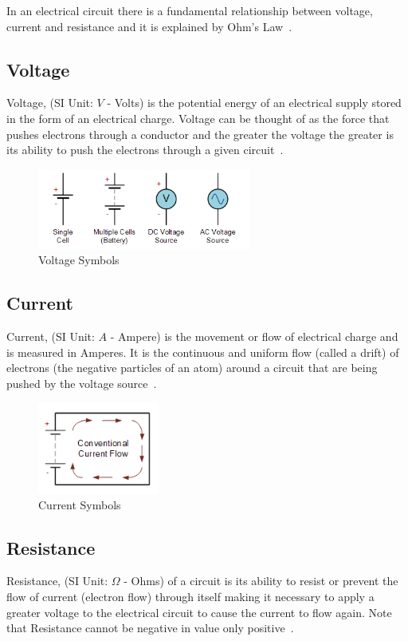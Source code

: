 In an electrical circuit there is a fundamental relationship between voltage, current and resistance and it is explained by Ohm’s Law~\citep{et-15}.

\subsection*{Voltage}
Voltage, (SI Unit: $V$ - Volts) is the potential energy of an electrical supply stored in the form of an electrical charge. Voltage can be thought of as the force that pushes electrons through a conductor and the greater the voltage the greater is its ability to push the electrons through a given circuit~\citep{et-15}.

%
\begin{figure}[ht]
	\centering
	\includegraphics[width=7cm]{images/02}
	\caption{Voltage Symbols \citep{et-15}}
	\label{fig:voltage_symbols}
\end{figure}
%

\subsection*{Current}
Current, (SI Unit: $A$ - Ampere) is the movement or flow of electrical charge and is measured in Amperes. It is the continuous and uniform flow (called a drift) of electrons (the negative particles of an atom) around a circuit that are being pushed by the voltage source~\citep{et-15}.

%
\begin{figure}[ht]
	\centering
	\includegraphics[width=4cm]{images/03}
	\caption{Current Symbols \citep{et-15}}
	\label{fig:current_symbols}
\end{figure}
%

\newpage
\subsection*{Resistance}
Resistance, (SI Unit: $\Omega$ - Ohms) of a circuit is its ability to resist or prevent the flow of current (electron flow) through itself making it necessary to apply a greater voltage to the electrical circuit to cause the current to flow again. Note that Resistance cannot be negative in value only positive~\citep{et-15}.

